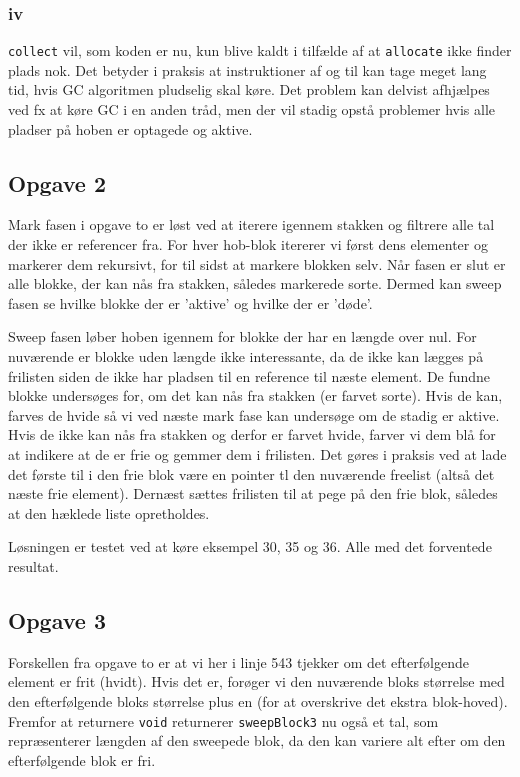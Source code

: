 \documentclass{article}
\begin{document}
\subsubsection*{iv}
\texttt{collect} vil, som koden er nu, kun blive kaldt i tilfælde af at \texttt{allocate} ikke finder plads nok. Det betyder i praksis at instruktioner af og til kan tage meget lang tid, hvis GC algoritmen pludselig skal køre. Det problem kan delvist afhjælpes ved fx at køre GC i en anden tråd, men der vil stadig opstå problemer hvis alle pladser på hoben er optagede og aktive.

\subsection*{Opgave 2}
Mark fasen i opgave to er løst ved at iterere igennem stakken og filtrere alle tal der ikke er referencer fra. For hver hob-blok itererer vi først dens elementer og markerer dem rekursivt, for til sidst at markere blokken selv. Når fasen er slut er alle blokke, der kan nås fra stakken, således markerede sorte. Dermed kan sweep fasen se hvilke blokke der er 'aktive' og hvilke der er 'døde'.

Sweep fasen løber hoben igennem for blokke der har en længde over nul. For nuværende er blokke uden længde ikke interessante, da de ikke kan lægges på frilisten siden de ikke har pladsen til en reference til næste element. De fundne blokke undersøges for, om det kan nås fra stakken (er farvet sorte). Hvis de kan, farves de hvide så vi ved næste mark fase kan undersøge om de stadig er aktive. Hvis de ikke kan nås fra stakken og derfor er farvet hvide, farver vi dem blå for at indikere at de er frie og gemmer dem i frilisten. Det gøres i praksis ved at lade det første til i den frie blok være en pointer tl den nuværende freelist (altså det næste frie element). Dernæst sættes frilisten til at pege på den frie blok, således at den hæklede liste opretholdes. 

Løsningen er testet ved at køre eksempel 30, 35 og 36. Alle med det forventede resultat.

\subsection*{Opgave 3}
Forskellen fra opgave to er at vi her i linje 543 tjekker om det efterfølgende element er frit (hvidt). Hvis det er, forøger vi den nuværende bloks størrelse med den efterfølgende bloks størrelse plus en (for at overskrive det ekstra blok-hoved). Fremfor at returnere \texttt{void} returnerer \texttt{sweepBlock3} nu også et tal, som repræsenterer længden af den sweepede blok, da den kan variere alt efter om den efterfølgende blok er fri.
\end{document}

